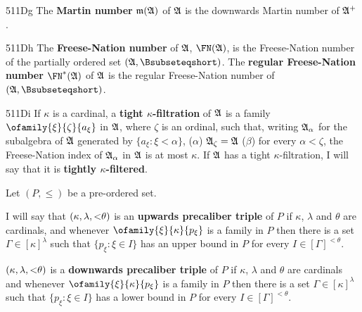 \spheader 511Dg The {\bf Martin number} %
$\frak m(\frak A)$ of $\frak A$ is the downwards Martin number of
$\frak A^+$.

\spheader 511Dh The {\bf Freese-Nation number} of $\frak A$,
$\FN(\frak A)$, is the Freese-Nation number of the partially ordered set
$(\frak A,\Bsubseteqshort)$.
The {\bf regular Freese-Nation number} $\FN^*(\frak A)$
of $\frak A$ is the regular Freese-Nation number of
$(\frak A,\Bsubseteqshort)$.

\spheader 511Di If
$\kappa$ is a cardinal, a {\bf tight $\kappa$-filtration} of $\frak A$
is a family $\ofamily{\xi}{\zeta}{a_{\xi}}$ in $\frak A$, where $\zeta$
is an ordinal, such that, writing
$\frak A_{\alpha}$ for the subalgebra of $\frak A$ generated by
$\{a_{\xi}:\xi<\alpha\}$,
($\alpha$) $\frak A_{\zeta}=\frak A$ ($\beta$) for every $\alpha<\zeta$,
the Freese-Nation index of $\frak A_{\alpha}$ in $\frak A$ is
at most $\kappa$.
If $\frak A$ has a tight $\kappa$-filtration, I will say that it is {\bf
tightly $\kappa$-filtered}.

 Let $(P,\le)$ be a pre-ordered set.

\medskip

 I will say that $(\kappa,\lambda,\hbox{$<$}\theta)$ is
an {\bf upwards precaliber triple} of $P$ if $\kappa$, $\lambda$ and
$\theta$
are cardinals, and whenever $\ofamily{\xi}{\kappa}{p_{\xi}}$ is a family
in $P$ then there is a set
$\Gamma\in[\kappa]^{\lambda}$ such that $\{p_{\xi}:\xi\in I\}$ has an
upper bound in $P$ for every $I\in[\Gamma]^{<\theta}$.

$(\kappa,\lambda,\hbox{$<$}\theta)$ is a
{\bf downwards precaliber
triple} of $P$ if $\kappa$, $\lambda$ and $\theta$ are cardinals and
whenever $\ofamily{\xi}{\kappa}{p_{\xi}}$ is a family in $P$ then there
is a set
$\Gamma\in[\kappa]^{\lambda}$ such that $\{p_{\xi}:\xi\in I\}$ has a
lower bound in $P$ for every $I\in[\Gamma]^{<\theta}$.


